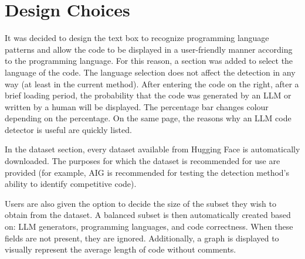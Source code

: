 \clearpage
\section{Design Choices}
It was decided to design the text box to recognize programming 
language patterns and allow the code to be displayed in a 
user-friendly manner according to the programming language. 
For this reason, a section was added to select the 
language of the code. The language selection does not affect 
the detection in any way (at least in the current method). 
After entering the code on the right, after a brief loading period, 
the probability that the code was generated by an LLM or written by 
a human will be displayed. The percentage bar changes colour 
depending on the percentage. On the same page, the reasons why an LLM code detector 
is useful are quickly listed.


In the dataset section, every dataset available from Hugging 
Face is automatically downloaded. The purposes for which the 
dataset is recommended for use are provided (for example, AIG 
is recommended for testing the detection method's ability to 
identify competitive code).

Users are also given the option to decide the size of the 
subset they wish to obtain from the dataset. A balanced subset 
is then automatically created based on: LLM generators, 
programming languages, and code correctness. When these 
fields are not present, they are ignored. Additionally, a 
graph is displayed to visually represent the average length 
of code without comments.


